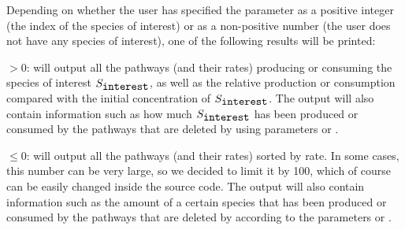 Depending on whether the user has specified the  parameter as a positive integer (the index of the species of interest) or as a non-positive number (the user does not have any species of interest), one of the following results will be printed:

 $> 0$: \pump{} will output all the pathways (and their rates) producing or consuming the species of interest $S_{\verb"interest"}$, as well as the relative production or consumption compared with the initial concentration of $S_{\verb"interest"}$. The output will also contain information such as how much $S_{\verb"interest"}$ has been produced or consumed by the pathways that are deleted by \pump{} using parameters  or . 

 $\leq 0$: \pump{} will output all the pathways (and their rates) sorted by rate. In some cases, this number can be very large, so we decided to limit it by 100, which of course can be easily changed inside the \pump{} source code. The output will also contain information such as the amount of a certain species that has been produced or consumed by the pathways that are deleted by \pump{} according to the parameters  or . 













